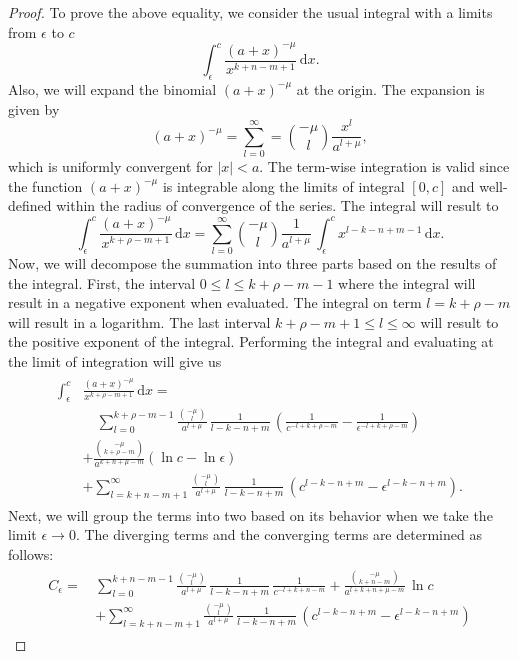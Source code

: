 \begin{proof}
To prove the above equality, we consider the usual integral with a limits from $\epsilon$ to $c$
\begin{equation}
    \int_{\epsilon}^{c} \frac{(a+x)^{-\mu}}{x^{k+n-m+1}}\,\mathrm{d}x.
\end{equation}
Also, we will expand the binomial $(a+x)^{-\mu}$ at the origin. The expansion is given by
\begin{equation}
    (a+x)^{-\mu} = \sum_{l=0}^{\infty} = {-\mu \choose l} \frac{x^{l}}{a^{l+\mu}},
    \label{TE}
\end{equation} 
which is uniformly convergent for $|x| < a$. The term-wise integration is valid since the function $(a+x)^{-\mu}$ is integrable along the limits of integral $[0,c]$ and well-defined within the radius of convergence of the series. The integral will result to
\begin{equation}
\int_{\epsilon}^{c} \frac{(a+x)^{-\mu}}{x^{k+\rho-m+1}} \,\mathrm{d}x =  \sum_{l=0}^{\infty} {-\mu \choose l}  \frac{1}{a^{l+\mu}} \, \int_{\epsilon}^{c} x^{l-k-n+m-1} \,\mathrm{d}x .
\label{FPIcase1}
\end{equation}
Now, we will decompose the summation into three parts based on the results of the integral. First, the interval $0 \leq l \leq k+\rho-m-1 $ where the integral will result in a negative exponent when evaluated. The integral on term $l = k +\rho -m$ will result in a logarithm. The last interval $k +\rho - m +1 \leq l \leq \infty$ will result to the positive exponent of the integral. Performing the integral and evaluating at the limit of integration will give us
\begin{align}
\begin{split}
\int_{\epsilon}^{c} & \frac{(a+x)^{-\mu}}{x^{k+\rho-m+1}}  \, \mathrm{d}x  =  \\& \quad \sum_{l=0}^{k+\rho-m-1} \frac{{-\mu \choose l}}{a^{l+\mu}} \, \frac{1}{l-k-n+m} \, \left( \frac{1}{c^{-l+k+\rho-m}} - \frac{1}{\epsilon^{-l+k+\rho-m}} \right) \\& + \frac{{-\mu \choose k+\rho-m}}{a^{k+n+\mu-m}} \left( \ln{c} - \ln{\epsilon} \right) \\& + \sum_{l=k+n-m+1}^{\infty} \frac{{-\mu \choose l}}{a^{l+\mu}} \, \frac{1}{l-k-n+m} \, \left( c^{l-k-n+m}-\epsilon^{l-k-n+m} \right).
\label{FPIc1}
\end{split}
\end{align}
Next, we will group the terms into two based on its behavior when we take the limit $\epsilon \to 0$. The diverging terms and the converging terms are determined as follows:
\begin{align}
\begin{split}
C_{\epsilon} = \,& \sum_{l=0}^{k+n-m-1} \frac{{-\mu \choose l}}{a^{l+\mu}} \, \frac{1}{l-k-n+m}  \, \frac{1}{c^{-l+k+n-m}} + \frac{{-\mu \choose k+n-m}}{a^{l+k+n+\mu-m}} \, \ln{c} \\& + \sum_{l=k+n-m+1}^{\infty} \frac{{-\mu \choose l}}{a^{l+\mu}} \, \frac{1}{l-k-n+m}  \, \left( c^{l-k-n+m}-\epsilon^{l-k-n+m} \right)
\end{split}
\end{align}


\end{proof}
